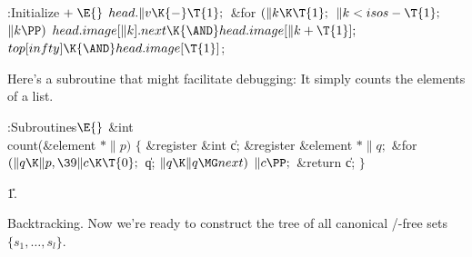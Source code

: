 \Y\B\4:Initialize\X${}\mathrel+\E{}$\6
$\\{head}.\|v\K{-}\T{1};{}$\6
\&{for} ${}(\|k\K\T{1};{}$ ${}\|k<\\{isos}-\T{1};{}$ ${}\|k\PP){}$\1\5
${}\\{head}.\\{image}[\|k].\\{next}\K{\AND}\\{head}.\\{image}[\|k+\T{1}];{}$\2\6
${}\\{top}[\\{infty}]\K{\AND}\\{head}.\\{image}[\T{1}]{}$;\par
\fi

Here's a subroutine that might facilitate debugging: It simply
counts the elements of a list.

\Y\B\4:Subroutines\X${}\E{}$\6
\&{int} \\{count}(\&{element} ${}{*}\|p){}$\1\1\2\2\6
${}\{{}$\1\6
\&{register} \&{int} \|c;\6
\&{register} \&{element} ${}{*}\|q;{}$\7
\&{for} ${}(\|q\K\|p,\39\|c\K\T{0};{}$ \|q; ${}\|q\K\|q\MG\\{next}){}$\1\5
${}\|c\PP;{}$\2\6
\&{return} \|c;\6
\4${}\}{}$\2\par
\U1.\fi

Backtracking. Now we're ready to construct the tree of all canonical
\SET/-free sets $\{s_1,\ldots,s_l\}$.

